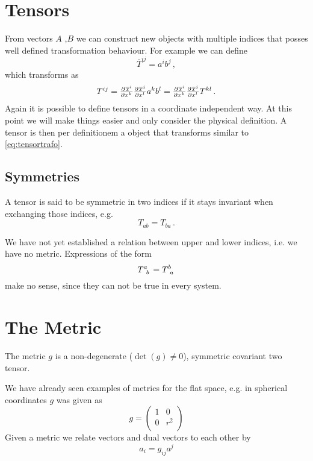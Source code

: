 \section{Tensors}
From vectors $A$ ,$B$ we can construct new objects with multiple indices that posses well defined transformation behaviour. 
For example we can define
\begin{equation}
    \overline{T}^{ij}=a^ib^j\, ,
\end{equation}
which transforms as
\begin{equation}
    T^{ij}=\pd{\overline{x}^i}{{x^k}}\pd{\overline{x}^j}{{x^l}}a^kb^l=\pd{\overline{x}^i}{{x^k}}\pd{\overline{x}^j}{{x^l}}T^{kl}\,
   .\label{eq:tensortrafo}
\end{equation}
Again it is possible to define tensors in a coordinate independent way. 
At this point we will make things easier and only consider the physical definition. 
A tensor is then per definitionem a object that transforms similar to
\eqref{eq:tensortrafo}.
\subsection{Symmetries}
A tensor is said to be symmetric in two indices if it stays invariant when exchanging those indices, e.g.
\begin{equation}
    T_{ab}=T_{ba}\, .
\end{equation}
\begin{remark}
We have not yet established a relation between upper and lower indices, i.e. we have no metric. Expressions of the form
\begin{equation}
    \tensor{T}{^a_b}=\tensor{T}{^b_a}
\end{equation}
make no sense, since they can not be true in every system.
\end{remark}
\section{The Metric}
\begin{definition}[Metric]
The metric $g$ is a non-degenerate ($\det(g)\neq 0$), symmetric covariant two
tensor.
\end{definition}
We have already seen examples of metrics for the flat space, e.g. in spherical coordinates $g$ was given as
\begin{equation}
    g=
    \begin{pmatrix}
        1 & 0\\
        0 & r^2\\
    \end{pmatrix}
\end{equation}
Given a metric we relate vectors and dual vectors to each other by
\begin{equation}
    a_i=g_{ij}a^j
\end{equation}
